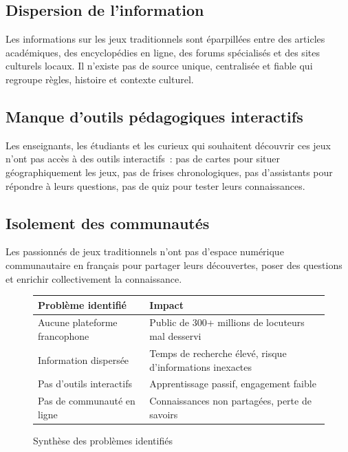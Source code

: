 \subsection{Dispersion de l'information}

Les informations sur les jeux traditionnels sont éparpillées entre des articles académiques,
des encyclopédies en ligne, des forums spécialisés et des sites culturels locaux. Il n'existe
pas de source unique, centralisée et fiable qui regroupe règles, histoire et contexte culturel.

\subsection{Manque d'outils pédagogiques interactifs}

Les enseignants, les étudiants et les curieux qui souhaitent découvrir ces jeux n'ont pas accès
à des outils interactifs~: pas de cartes pour situer géographiquement les jeux, pas de frises
chronologiques, pas d'assistants pour répondre à leurs questions, pas de quiz pour tester leurs
connaissances.

\subsection{Isolement des communautés}

Les passionnés de jeux traditionnels n'ont pas d'espace numérique communautaire en français pour
partager leurs découvertes, poser des questions et enrichir collectivement la connaissance.

\begin{figure}[H]
    \centering
    \begin{tabular}{|p{5cm}|p{8cm}|}
        \hline
        \textbf{Problème identifié} & \textbf{Impact} \\
        \hline
        Aucune plateforme francophone & Public de 300+ millions de locuteurs mal desservi \\
        \hline
        Information dispersée & Temps de recherche élevé, risque d'informations inexactes \\
        \hline
        Pas d'outils interactifs & Apprentissage passif, engagement faible \\
        \hline
        Pas de communauté en ligne & Connaissances non partagées, perte de savoirs \\
        \hline
    \end{tabular}
    \caption{Synthèse des problèmes identifiés}
    \label{tab:problemes}
\end{figure}

